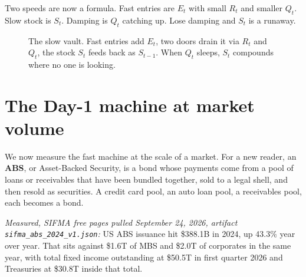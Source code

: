 Two speeds are now a formula. Fast entries are $E_t$ with small $R_t$ and smaller $Q_t$. Slow stock is $S_t$. Damping is $Q_t$ catching up. Lose damping and $S_t$ is a runaway.

\begin{figure}[h]
\centering
{}
\caption{The slow vault. Fast entries add $E_t$, two doors drain it via $R_t$ and $Q_t$, the stock $S_t$ feeds back as $S_{t-1}$. When $Q_t$ sleeps, $S_t$ compounds where no one is looking.}
\label{fig:timeline-vault}
\end{figure}

\section{The Day-1 machine at market volume}

We now measure the fast machine at the scale of a market. For a new reader, an \textbf{ABS}, or Asset-Backed Security, is a bond whose payments come from a pool of loans or receivables that have been bundled together, sold to a legal shell, and then resold as securities. A credit card pool, an auto loan pool, a receivables pool, each becomes a bond.

\textit{Measured, SIFMA free pages pulled September 24, 2026, artifact \texttt{sifma\_abs\_2024\_v1.json}:} US ABS issuance hit \$388.1B in 2024, up 43.3\% year over year. That sits against \$1.6T of MBS and \$2.0T of corporates in the same year, with total fixed income outstanding at \$50.5T in first quarter 2026 and Treasuries at \$30.8T inside that total.

